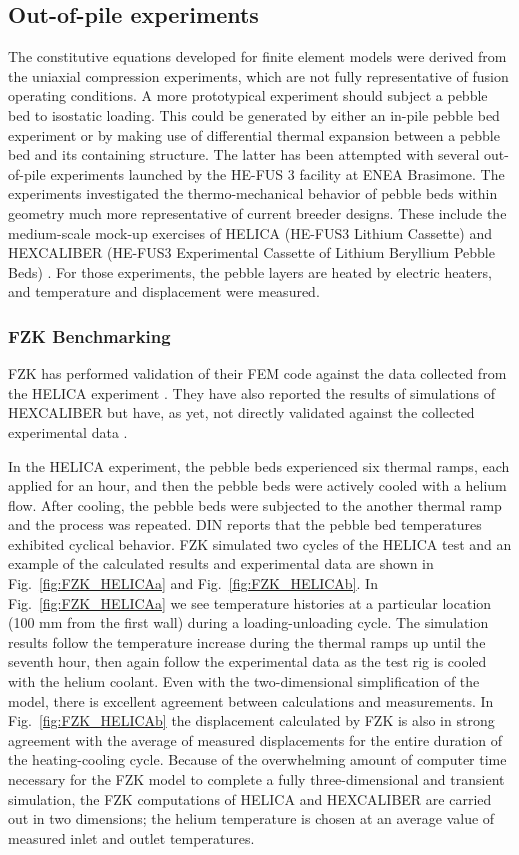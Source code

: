 \subsection{Out-of-pile experiments}
The constitutive equations developed for finite element models were derived from the uniaxial compression experiments, which are not fully representative of fusion operating conditions. A more prototypical experiment should subject a pebble bed to isostatic loading. This could be generated by either an in-pile pebble bed experiment or by making use of differential thermal expansion between a pebble bed and its containing structure. The latter has been attempted with several out-of-pile experiments launched by the HE-FUS 3 facility at ENEA Brasimone. The experiments investigated the thermo-mechanical behavior of pebble beds within geometry much more representative of current breeder designs. These include the medium-scale mock-up exercises of HELICA (HE-FUS3 Lithium Cassette) and HEXCALIBER (HE-FUS3 Experimental Cassette of Lithium Beryllium Pebble Beds) \cite{dellorco:2006,DiMaio20081287}. For those experiments, the pebble layers are heated by electric heaters, and temperature and displacement were measured.

\subsubsection{FZK Benchmarking}
FZK has performed validation of their FEM code against the data collected from the HELICA experiment \cite{Gan:2008kx}. They have also reported the results of simulations of HEXCALIBER but have, as yet, not directly validated against the collected experimental data \cite{Gan:2009vn}.

In the HELICA experiment, the pebble beds experienced six thermal ramps, each applied for an hour, and then the pebble beds were actively cooled with a helium flow. After cooling, the pebble beds were subjected to the another thermal ramp and the process was repeated. DIN reports\cite{dellorco:2006} that the pebble bed temperatures exhibited cyclical behavior. FZK simulated two cycles of the HELICA test and an example of the calculated results and experimental data are shown in Fig.~\ref{fig:FZK_HELICAa} and Fig.~\ref{fig:FZK_HELICAb}. In Fig.~\ref{fig:FZK_HELICAa} we see temperature histories at a particular location (100 mm from the first wall) during a loading-unloading cycle. The simulation results follow the temperature increase during the thermal ramps up until the seventh hour, then again follow the experimental data as the test rig is cooled with the helium coolant. Even with the two-dimensional simplification of the model, there is excellent agreement between calculations and measurements. In Fig.~\ref{fig:FZK_HELICAb} the displacement calculated by FZK is also in strong agreement with the average of measured displacements for the entire duration of the heating-cooling cycle. Because of the overwhelming amount of computer time necessary for the FZK model to complete a fully three-dimensional and transient simulation, the FZK computations of HELICA and HEXCALIBER are carried out in two dimensions; the helium temperature is chosen at an average value of measured inlet and outlet temperatures.

